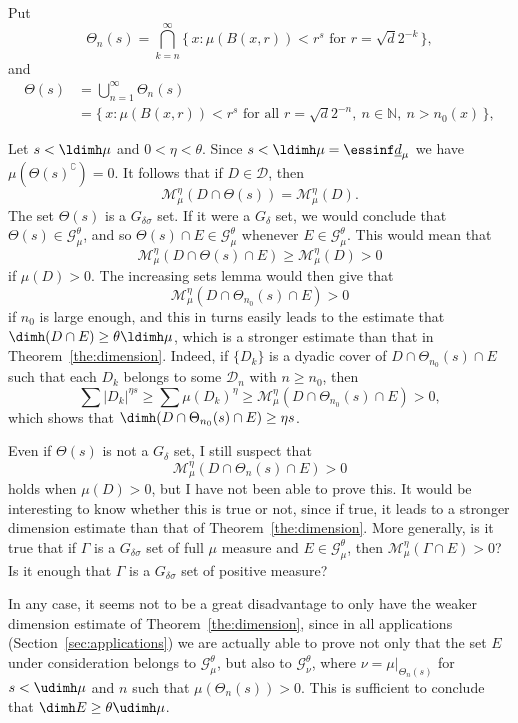 \begin{rema}\label{rem:dimension}
Put
\[
\Theta_n (s) = \bigcap_{k=n}^\infty \{\, x : \mu (B (x,r)) < r^s
\text{ for } r = \sqrt{d} 2^{-k} \,\},
\]
and
\begin{align*}
\Theta (s) &= \bigcup_{n=1}^\infty \Theta_n (s)
\\ &= \{\, x : \mu (B (x,r)) < r^s \text{ for all } r = \sqrt{d} 2^{-n},\ n \in \mathbb{N},\ n> n_0 (x) \,\},
\end{align*}

Let $s < \ldimh \mu$ and $0 < \eta < \theta$. Since $s < \ldimh \mu = \essinf \underline{d}_\mu$ we have $\mu (\Theta(s)^\complement) = 0$. It follows that if $D \in \mathscr{D}$, then
\[
\mathscr{M}_\mu^\eta (D \cap \Theta (s)) =
\mathscr{M}_\mu^\eta (D).
\]
The set $\Theta (s)$ is a $G_{\delta \sigma}$ set. If it were a $G_\delta$ set, we would conclude that $\Theta (s) \in
\mathscr{G}_\mu^\theta$, and so $\Theta (s) \cap E \in
\mathscr{G}_\mu^\theta$ whenever $E \in
\mathscr{G}_\mu^\theta$. This would mean that
\[
\mathscr{M}_\mu^\eta (D \cap \Theta (s) \cap E) \geq
\mathscr{M}_\mu^\eta (D) > 0
\]
if $\mu (D) > 0$. The increasing sets lemma would then give that
\[
\mathscr{M}_\mu^\eta (D \cap \Theta_{n_0} (s) \cap E) > 0
\]
if $n_0$ is large enough, and this in turns easily leads to the estimate that $\dimh (D \cap E) \geq \theta \ldimh \mu$, which is a stronger estimate than that in Theorem~\ref{the:dimension}. Indeed, if $\{D_k\}$ is a dyadic cover of $D \cap \Theta_{n_0} (s) \cap E$ such that each $D_k$ belongs to some $\mathscr{D}_n$ with $n \geq n_0$, then
\[
\sum |D_k|^{\eta s} \geq \sum \mu (D_k)^\eta \geq
\mathscr{M}_\mu^\eta (D \cap \Theta_{n_0} (s) \cap E) > 0,
\]
which shows that $\dimh (D \cap \Theta_{n_0} (s) \cap E) \geq \eta s$.

Even if $\Theta (s)$ is not a $G_\delta$ set, I still suspect that
\[
\mathscr{M}_\mu^\eta (D \cap \Theta_n (s) \cap E) > 0
\]
holds when $\mu (D) > 0$, but I have not been able to prove this. It would be interesting to know whether this is true or not, since if true, it leads to a stronger dimension estimate than that of Theorem~\ref{the:dimension}. More generally, is it true that if $\Gamma$ is a $G_{\delta \sigma}$ set of full $\mu$ measure and $E
\in \mathscr{G}_\mu^\theta$, then $\mathscr{M}_\mu^\eta (\Gamma \cap E) > 0$? Is it enough that $\Gamma$ is a $G_{\delta \sigma}$ set of positive measure?

In any case, it seems not to be a great disadvantage to only have the weaker dimension estimate of Theorem~\ref{the:dimension}, since in all applications (Section~\ref{sec:applications}) we are actually able to prove not only that the set $E$ under consideration belongs to $\mathscr{G}_\mu^\theta$, but also to $\mathscr{G}_\nu^\theta$, where $\nu = \mu |_{\Theta_n (s)}$ for $s < \udimh \mu$ and $n$ such that $\mu (\Theta_n (s)) > 0$. This is sufficient to conclude that $\dimh E \geq \theta \udimh \mu$.
\end{rema}

